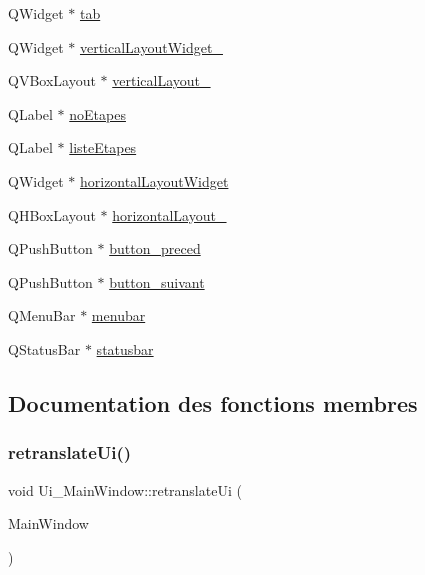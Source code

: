 \begin{DoxyCompactItemize}
\item 
Q\+Widget $\ast$ \hyperlink{classUi__MainWindow_a3efc28c664e9f5115095aafbbc5ac6bc}{tab}
\item 
Q\+Widget $\ast$ \hyperlink{classUi__MainWindow_acfaf6d66c957965550714c6b9bd0edc0}{vertical\+Layout\+Widget\+\_}
\item 
Q\+V\+Box\+Layout $\ast$ \hyperlink{classUi__MainWindow_a38b8a4b887f3b58e2a49e7905ae6f1f0}{vertical\+Layout\+\_}
\item 
Q\+Label $\ast$ \hyperlink{classUi__MainWindow_aa375f56e2e2ab48391b872c851c21047}{no\+Etapes}
\item 
Q\+Label $\ast$ \hyperlink{classUi__MainWindow_a84aca9c0f7468f334d9865cfadbb543a}{liste\+Etapes}
\item 
Q\+Widget $\ast$ \hyperlink{classUi__MainWindow_a9271976c4376de565bfe96c296f4db1e}{horizontal\+Layout\+Widget}
\item 
Q\+H\+Box\+Layout $\ast$ \hyperlink{classUi__MainWindow_a80867018070156432923d0266cc9fe25}{horizontal\+Layout\+\_}
\item 
Q\+Push\+Button $\ast$ \hyperlink{classUi__MainWindow_ad414d11a8c66c96e45d4d3a6029c4272}{button\+\_\+preced}
\item 
Q\+Push\+Button $\ast$ \hyperlink{classUi__MainWindow_ae5ecde4d9889cfd958321f60285ccdd6}{button\+\_\+suivant}
\item 
Q\+Menu\+Bar $\ast$ \hyperlink{classUi__MainWindow_adf43d9a67adaec750aaa956b5e082f09}{menubar}
\item 
Q\+Status\+Bar $\ast$ \hyperlink{classUi__MainWindow_a1687cceb1e2787aa1f83e50433943a91}{statusbar}
\end{DoxyCompactItemize}


\subsection{Documentation des fonctions membres}
\mbox{\label{classUi__MainWindow_a097dd160c3534a204904cb374412c618}} 
\subsubsection{\texorpdfstring{retranslate\+Ui()}{retranslateUi()}}
{\footnotesize\ttfamily void Ui\+\_\+\+Main\+Window\+::retranslate\+Ui (\begin{DoxyParamCaption}\item[{Q\+Main\+Window $\ast$}]{Main\+Window }\end{DoxyParamCaption})\hspace{0.3cm}{\ttfamily [inline]}}

